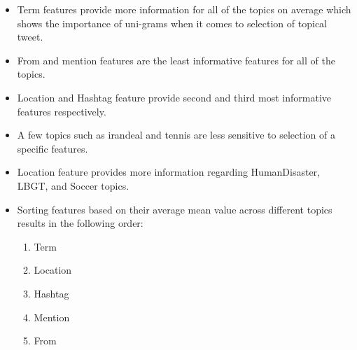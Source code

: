 \begin{itemize}
\item Term features provide more information for all of the topics on average which shows the importance of uni-grams when it comes to selection of topical tweet.
\item From and mention features are the least informative features for all of the topics.
\item Location and Hashtag feature provide second and third most informative features respectively.
\item A few topics such as irandeal and tennis are less sensitive to selection of a specific features.
\item Location feature provides more information regarding HumanDisaster, LBGT, and Soccer topics.
\item Sorting features based on their average mean value across different topics results in the following order:
\begin{enumerate}
\item Term
\item Location
\item Hashtag
\item Mention
\item From
\end{enumerate}
\end{itemize}

